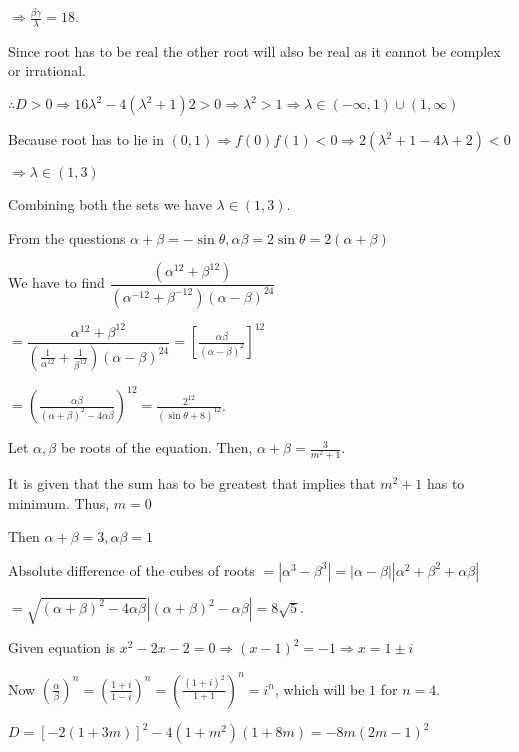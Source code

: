   $\Rightarrow \frac{\beta\gamma}{\lambda} = 18$.
\item Since root has to be real the other root will also be real as it cannot be complex or irrational.

  $\therefore D > 0 \Rightarrow 16\lambda^2 - 4\left(\lambda^2 + 1\right)2 > 0 \Rightarrow \lambda^2 >
  1\Rightarrow \lambda\in(-\infty, 1)\cup (1, \infty)$

  Because root has to lie in $(0, 1)\Rightarrow f(0)f(1) < 0 \Rightarrow 2\left(\lambda^2 + 1 - 4\lambda +
  2\right) < 0$

  $\Rightarrow \lambda\in(1, 3)$

  Combining both the sets we have $\lambda\in(1, 3)$.
\item From the questions $\alpha + \beta = -\sin\theta, \alpha\beta = 2\sin\theta = 2(\alpha + \beta)$

  We have to find $\dfrac{\left(\alpha^{12} +\beta^{12}\right)}{\left(\alpha^{-12} +
    \beta^{-12}\right)(\alpha - \beta)^{24}}$

  $= \dfrac{\alpha^{12} + \beta^{12}}{\left(\frac{1}{\alpha^{12}} + \frac{1}{\beta^{12}}\right)(\alpha -
    \beta)^{24}} = \left[\frac{\alpha\beta}{(\alpha - \beta)^2}\right]^{12}$

  $= \left(\frac{\alpha\beta}{(\alpha + \beta)^2 - 4\alpha\beta}\right)^{12} = \frac{2^{12}}{(\sin\theta +
    8)^{12}}$.
\item Let $\alpha, \beta$ be roots of the equation. Then, $\alpha + \beta = \frac{3}{m^2 + 1}$.

  It is given that the sum has to be greatest that implies that $m^2 + 1$ has to minimum. Thus, $m = 0$

  Then $\alpha + \beta = 3, \alpha\beta = 1$

  Absolute difference of the cubes of roots $= \left|\alpha^3 - \beta^3\right| = |\alpha -
  \beta|\left|\alpha^2 + \beta^2 + \alpha\beta\right|$

  $= \sqrt{(\alpha + \beta)^2 - 4\alpha\beta}\left|(\alpha + \beta)^2 - \alpha\beta\right| = 8\sqrt{5}$.
\item Given equation is $x^2 - 2x - 2 = 0 \Rightarrow (x - 1)^2 = -1 \Rightarrow x = 1\pm i$

  Now $\left(\frac{\alpha}{\beta}\right)^n = \left(\frac{1 + i}{1 - i}\right)^n = \left(\frac{(1 + i)^2}{1 +
    1}\right)^n = i^n$, which will be $1$ for $n = 4$.
\item $D = [-2(1 + 3m)]^2 - 4(1 + m^2)(1 + 8m) = -8m(2m - 1)^2$

